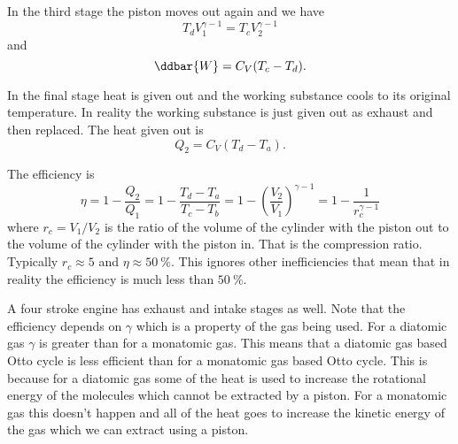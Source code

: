     In the third stage the piston moves out again and we have
    \[T_dV_1^{\gamma-1} = T_cV_2^{\gamma-1}\]
    and
    \[\ddbar{W} = C_V(T_c - T_d).\]
    
    In the final stage heat is given out and the working substance cools to its original temperature.
    In reality the working substance is just given out as exhaust and then replaced.
    The heat given out is
    \[Q_2 = C_V(T_d - T_a).\]
    
    The efficiency is
    \[\eta = 1 - \frac{Q_2}{Q_1} = 1 - \frac{T_d - T_a}{T_c - T_b} = 1 - \left(\frac{V_2}{V_1}\right)^{\gamma-1} = 1 - \frac{1}{r_c^{\gamma-1}}\]
    where \(r_c = V_1/V_2\) is the ratio of the volume of the cylinder with the piston out to the volume of the cylinder with the piston in.
    That is the compression ratio.
    Typically \(r_c \approx 5\) and \(\eta\approx\SI{50}{\percent}\).
    This ignores other inefficiencies that mean that in reality the efficiency is much less than \(\SI{50}{\percent}\).
    
    A four stroke engine has exhaust and intake stages as well.
    Note that the efficiency depends on \(\gamma\) which is a property of the gas being used.
    For a diatomic gas \(\gamma\) is greater than for a monatomic gas.
    This means that a diatomic gas based Otto cycle is less efficient than for a monatomic gas based Otto cycle.
    This is because for a diatomic gas some of the heat is used to increase the rotational energy of the molecules which cannot be extracted by a piston.
    For a monatomic gas this doesn't happen and all of the heat goes to increase the kinetic energy of the gas which we can extract using a piston.
    
